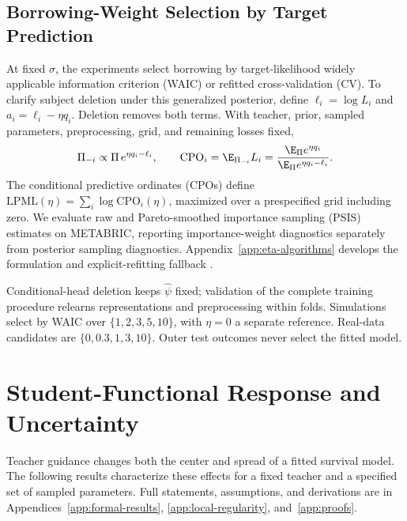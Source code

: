 \documentclass{article} %
\begin{document}
\subsection{Borrowing-Weight Selection by Target Prediction}
\label{sec:hyperparameters-main}
At fixed $\sigma$, the experiments select borrowing by target-likelihood widely applicable information criterion (WAIC) or refitted cross-validation (CV). To clarify subject deletion under this generalized posterior, define $\ell_i=\log L_i$ and $a_i=\ell_i-\eta q_i$. Deletion removes both terms. With teacher, prior, sampled parameters, preprocessing, grid, and remaining losses fixed,
\begin{equation}
\Pi_{-i}\propto\Pi\,e^{\eta q_i-\ell_i},\qquad
\mathrm{CPO}_i=\E_{\Pi_{-i}}L_i
=\frac{\E_\Pi e^{\eta q_i}}{\E_\Pi e^{\eta q_i-\ell_i}}.
\label{eq:cpo-main}
\end{equation}
The conditional predictive ordinates (CPOs) define $\mathrm{LPML}(\eta)=\sum_i\log\mathrm{CPO}_i(\eta)$, maximized over a prespecified grid including zero. We evaluate raw and Pareto-smoothed importance sampling (PSIS) estimates on METABRIC, reporting importance-weight diagnostics separately from posterior sampling diagnostics. Appendix~\ref{app:eta-algorithms} develops the formulation and explicit-refitting fallback \citep{vehtari2024}.

Conditional-head deletion keeps $\widehat\psi$ fixed; validation of the complete training procedure relearns representations and preprocessing within folds. Simulations select by WAIC over $\{1,2,3,5,10\}$, with $\eta=0$ a separate reference. Real-data candidates are $\{0,0.3,1,3,10\}$. Outer test outcomes never select the fitted model.

\section{Student-Functional Response and Uncertainty}
\label{sec:properties}
Teacher guidance changes both the center and spread of a fitted survival model. The following results characterize these effects for a fixed teacher and a specified set of sampled parameters. Full statements, assumptions, and derivations are in Appendices~\ref{app:formal-results}, \ref{app:local-regularity}, and~\ref{app:proofs}.
\end{document}
